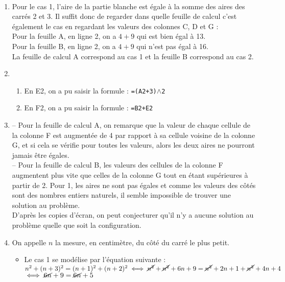 \ \\ [-5mm]
   \begin{enumerate}
      \item Pour le cas 1, l'aire de la partie blanche est égale à la somme des aires des carrés 2 et 3. Il suffit donc de regarder dans quelle feuille de calcul c'est également le cas en regardant les valeurs des colonnes C, D et G : \\
         Pour la feuille A, en ligne 2, on a $4 + 9$ qui est bien égal à 13. \\
         Pour la feuille B, en ligne 2, on a $4 + 9$ qui n'est pas égal à 16. \\
        {\blue La feuille de calcul A correspond au cas 1 et la feuille B correspond au cas 2}.
      \item
         \begin{enumerate}
            \item En E2, on a pu saisir la formule : {\blue \texttt{=(A2+3)$\wedge$2}}
            \item En F2, on a pu saisir la formule : {\blue \texttt{=B2+E2}}
         \end{enumerate}
      \setcounter{enumi}{2}
      \item -- Pour la feuille de calcul A, on remarque que la valeur de chaque cellule de la colonne F est augmentée de 4 par rapport à sa cellule voisine de la colonne G, et si cela se vérifie pour toutes les valeurs, alors les deux aires ne pourront jamais être égales. \\
         -- Pour la feuille de calcul B, les valeurs des cellules de la colonne F augmentent plus vite que celles de la colonne G tout en étant supérieures à partir de 2. Pour 1, les aires ne sont pas égales et comme les valeurs des côtés sont des nombres entiers naturels, il semble impossible de trouver une solution au problème. \\
      {\blue D'après les copies d'écran, on peut conjecturer qu'il n'y a aucune solution au problème quelle que soit la configuration}.
   \item On appelle $n$ la mesure, en centimètre, du côté du carré le plus petit.
      \begin{itemize}
         \item Le cas 1 se modélise par l'équation suivante : \\
            $n^2+(n+3)^2 =(n+1)^2+(n+2)^2 \iff \cancel{n^2}+\cancel{n^2}+6n+9 =\cancel{n^2}+2n+1+\cancel{n^2}+4n+4$ \\
            \hspace*{4.95cm} $\iff \cancel{6n}+9 =\cancel{6n}+5$ \\

\end{itemize}
\end{enumerate}
